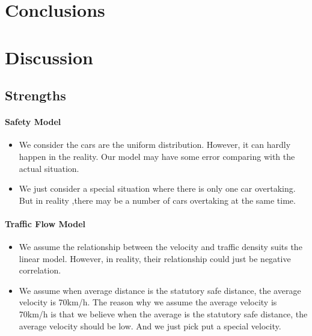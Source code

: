 
\section{Conclusions}




\section{Discussion}

\subsection{Strengths}

\paragraph{Safety Model}

\begin{itemize}
\item We consider the cars are the uniform distribution. However, it can hardly happen in the reality. Our model may have some error comparing with the actual situation.
\item We just consider a special situation where there is only one car overtaking. But in reality ,there may be a number of cars overtaking at the same time.
\end{itemize}

\paragraph{Traffic Flow Model}

\begin{itemize}
\item We assume the relationship between the velocity and traffic density suits the linear model. However, in reality, their relationship could just be negative correlation.
\item We assume when average distance is the statutory safe distance, the average  velocity is 70km/h. The reason why we assume the average velocity is 70km/h is that we believe when the average is the statutory safe distance, the average velocity should be low. And we just pick put a special velocity.
\end{itemize}


